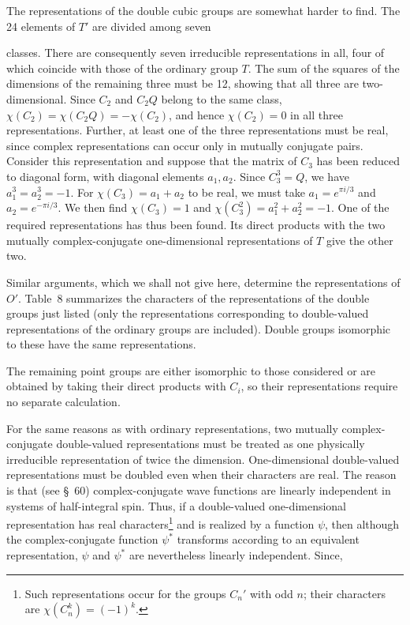 The representations of the double cubic groups are somewhat harder to find. The 24 elements of $T'$ are divided among seven

classes. There are consequently seven irreducible representations in all, four of which coincide with those of the ordinary group $T$. The sum of the squares of the dimensions of the remaining three must be 12, showing that all three are two-dimensional. Since $C_2$ and $C_2Q$ belong to the same class, $\chi(C_2)=\chi(C_2Q)=-\chi(C_2)$, and hence $\chi(C_2)=0$ in all three representations. Further, at least one of the three representations must be real, since complex representations can occur only in mutually conjugate pairs. Consider this representation and suppose that the matrix of $C_3$ has been reduced to diagonal form, with diagonal elements $a_1,a_2$. Since $C_3^3=Q$, we have $a_1^3=a_2^3=-1$. For $\chi(C_3)=a_1+a_2$ to be real, we must take $a_1=e^{\pi i/3}$ and $a_2=e^{-\pi i/3}$. We then find $\chi(C_3)=1$ and $\chi(C_3^2)=a_1^2+a_2^2=-1$. One of the required representations has thus been found. Its direct products with the two mutually complex-conjugate one-dimensional representations of $T$ give the other two.

Similar arguments, which we shall not give here, determine the representations of $O'$. Table~8 summarizes the characters of the representations of the double groups just listed (only the representations corresponding to double-valued representations of the ordinary groups are included). Double groups isomorphic to these have the same representations.

The remaining point groups are either isomorphic to those considered or are obtained by taking their direct products with $C_i$, so their representations require no separate calculation.

For the same reasons as with ordinary representations, two mutually complex-conjugate double-valued representations must be treated as one physically irreducible representation of twice the dimension. One-dimensional double-valued representations must be doubled even when their characters are real. The reason is that (see \S~60) complex-conjugate wave functions are linearly independent in systems of half-integral spin. Thus, if a double-valued one-dimensional representation has real characters\footnote{Such representations occur for the groups $C_n'$ with odd $n$; their characters are $\chi(C_n^k)=(-1)^k$.} and is realized by a function $\psi$, then although the complex-conjugate function $\psi^*$ transforms according to an equivalent representation, $\psi$ and $\psi^*$ are nevertheless linearly independent. Since,

